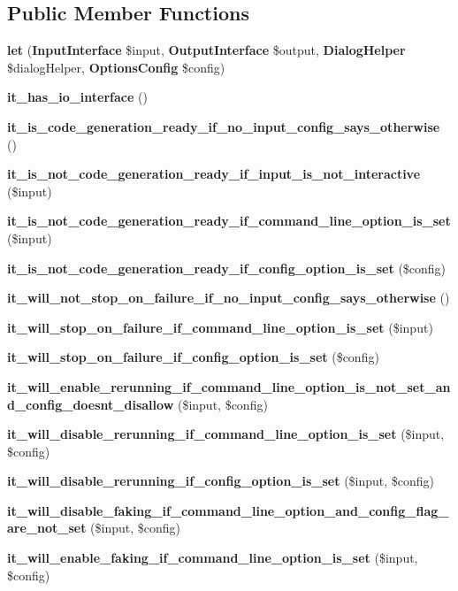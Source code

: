 \subsection*{Public Member Functions}
\begin{DoxyCompactItemize}
\item 
{\bf let} ({\bf Input\+Interface} \$input, {\bf Output\+Interface} \$output, {\bf Dialog\+Helper} \$dialog\+Helper, {\bf Options\+Config} \$config)
\item 
{\bf it\+\_\+has\+\_\+io\+\_\+interface} ()
\item 
{\bf it\+\_\+is\+\_\+code\+\_\+generation\+\_\+ready\+\_\+if\+\_\+no\+\_\+input\+\_\+config\+\_\+says\+\_\+otherwise} ()
\item 
{\bf it\+\_\+is\+\_\+not\+\_\+code\+\_\+generation\+\_\+ready\+\_\+if\+\_\+input\+\_\+is\+\_\+not\+\_\+interactive} (\$input)
\item 
{\bf it\+\_\+is\+\_\+not\+\_\+code\+\_\+generation\+\_\+ready\+\_\+if\+\_\+command\+\_\+line\+\_\+option\+\_\+is\+\_\+set} (\$input)
\item 
{\bf it\+\_\+is\+\_\+not\+\_\+code\+\_\+generation\+\_\+ready\+\_\+if\+\_\+config\+\_\+option\+\_\+is\+\_\+set} (\$config)
\item 
{\bf it\+\_\+will\+\_\+not\+\_\+stop\+\_\+on\+\_\+failure\+\_\+if\+\_\+no\+\_\+input\+\_\+config\+\_\+says\+\_\+otherwise} ()
\item 
{\bf it\+\_\+will\+\_\+stop\+\_\+on\+\_\+failure\+\_\+if\+\_\+command\+\_\+line\+\_\+option\+\_\+is\+\_\+set} (\$input)
\item 
{\bf it\+\_\+will\+\_\+stop\+\_\+on\+\_\+failure\+\_\+if\+\_\+config\+\_\+option\+\_\+is\+\_\+set} (\$config)
\item 
{\bf it\+\_\+will\+\_\+enable\+\_\+rerunning\+\_\+if\+\_\+command\+\_\+line\+\_\+option\+\_\+is\+\_\+not\+\_\+set\+\_\+and\+\_\+config\+\_\+doesnt\+\_\+disallow} (\$input, \$config)
\item 
{\bf it\+\_\+will\+\_\+disable\+\_\+rerunning\+\_\+if\+\_\+command\+\_\+line\+\_\+option\+\_\+is\+\_\+set} (\$input, \$config)
\item 
{\bf it\+\_\+will\+\_\+disable\+\_\+rerunning\+\_\+if\+\_\+config\+\_\+option\+\_\+is\+\_\+set} (\$input, \$config)
\item 
{\bf it\+\_\+will\+\_\+disable\+\_\+faking\+\_\+if\+\_\+command\+\_\+line\+\_\+option\+\_\+and\+\_\+config\+\_\+flag\+\_\+are\+\_\+not\+\_\+set} (\$input, \$config)
\item 
{\bf it\+\_\+will\+\_\+enable\+\_\+faking\+\_\+if\+\_\+command\+\_\+line\+\_\+option\+\_\+is\+\_\+set} (\$input, \$config)

\end{DoxyCompactItemize}
